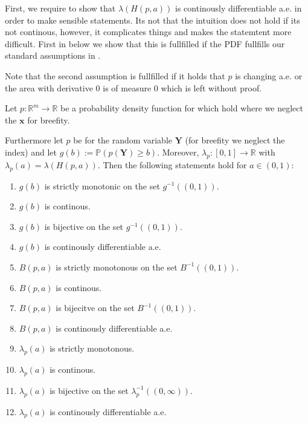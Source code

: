 First, we require to show that $\lambda(H(p, a))$ is continously differentiable a.e. in order to make sensible statements. Its not that the intuition does not hold if its not continous, however, it complicates things and makes the statemtent more difficult. First in  below we show that this is fullfilled if the PDF fullfills our standard assumptions in .

Note that the second assumption is fullfilled if it holds that $p$ is changing a.e. or the area with derivative $0$ is of measure $0$ which is left without proof. %

\begin{lemma}\label{lem:continuity}
    Let \(p: \mathbb{R}^m \to \mathbb{R}\) be a probability density function for which  hold where we neglect the $\mathbf{x}$ for breefity.
    
    Furthermore let $p$ be for the random variable $\mathbf{Y}$ (for breefity we neglect the index) and let $g(b) := \mathbb{P}(p(\mathbf{Y}) \geq b)$. Moreover, $\lambda_p:[0, 1] \to \mathbb{R}$ with $\lambda_p(a) = \lambda(H(p, a))$. Then the following statements hold for $a \in (0,1)$:

    \begin{enumerate}
        \item $g(b)$ is strictly monotonic on the set $g^{-1}((0,1))$.
        \item $g(b)$ is continous.
        \item $g(b)$ is bijective on the set $g^{-1}((0,1))$.
        \item $g(b)$ is continously differentiable a.e. %
        \item $B(p, a)$ is strictly monotonous on the set $B^{-1}((0,1))$.
        \item $B(p, a)$ is continous.
        \item $B(p, a)$ is bijecitve on the set $B^{-1}((0,1))$.
        \item $B(p, a)$ is continously differentiable a.e. %
        \item $\lambda_p(a)$ is strictly monotonous.
        \item $\lambda_p(a)$ is continous.
        \item $\lambda_p(a)$ is bijective on the set $\lambda_p^{-1}((0,\infty))$.
        \item $\lambda_p(a)$ is continously differentiable a.e. %
    \end{enumerate}
\end{lemma}


